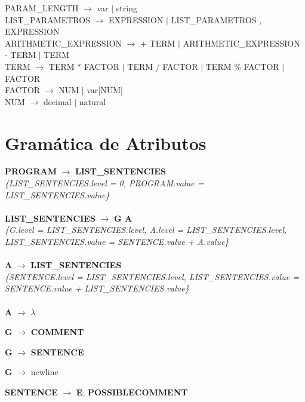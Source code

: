 \documentclass[10pt,a4paper]{article}
\begin{document}
PARAM\_LENGTH $\rightarrow$ var $|$ string \\

LIST\_PARAMETROS $\rightarrow$ EXPRESSION $|$ LIST\_PARAMETROS , EXPRESSION \\

ARITHMETIC\_EXPRESSION $\rightarrow$  + TERM $|$ ARITHMETIC\_EXPRESSION - TERM $|$ TERM \\

TERM $\rightarrow$ TERM $*$ FACTOR $|$ TERM $/$ FACTOR $|$ TERM \% FACTOR $|$ FACTOR \\

FACTOR $\rightarrow$ NUM $|$ var[NUM] \\

NUM $\rightarrow$ decimal $|$ natural


\section{Gramática de Atributos}

\textbf{PROGRAM} $\rightarrow$ \textbf{LIST\_SENTENCIES} \\

\textit{\{LIST\_SENTENCIES.level = 0, PROGRAM.value = LIST\_SENTENCIES.value\}} \\ \\


\textbf{LIST\_SENTENCIES} $\rightarrow$ \textbf{G A}\\

\textit{\{G.level = LIST\_SENTENCIES.level, A.level = LIST\_SENTENCIES.level, LIST\_SENTENCIES.value = SENTENCE.value + A.value\}}  \\ \\


\textbf{A} $\rightarrow$ \textbf{LIST\_SENTENCIES}\\

\textit{\{SENTENCE.level = LIST\_SENTENCIES.level, LIST\_SENTENCIES.value = SENTENCE.value + LIST\_SENTENCIES.value\}} \\  \\

\textbf{A} $\rightarrow$ $\lambda$ 

\textbf{G} $\rightarrow$ \textbf{COMMENT}

\textbf{G} $\rightarrow$ \textbf{SENTENCE}

\textbf{G} $\rightarrow$ newline


\textbf{SENTENCE} $\rightarrow$ \textbf{E}; \textbf{POSSIBLECOMMENT}\\ 
\end{document}
